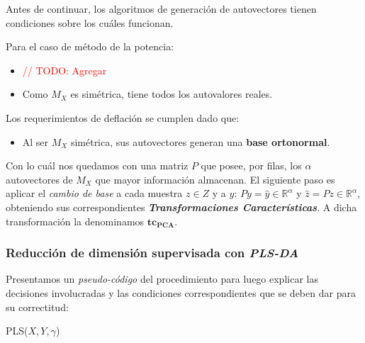 Antes de continuar, los algoritmos de generaci\'on de autovectores tienen condiciones sobre los cu\'ales funcionan.

Para el caso de m\'etodo de la potencia:

\begin{itemize}
\item \textcolor{red}{// TODO: Agregar}
\item Como $M_{X}$ es sim\'etrica, tiene todos los autovalores reales.
\end{itemize}

Los requerimientos de deflaci\'on se cumplen dado que:

\begin{itemize}
\item Al ser $M_{X}$ sim\'etrica, sus autovectores generan una \textbf{base ortonormal}.
\end{itemize}

Con lo cu\'al nos quedamos con una matriz $P$ que posee, por filas, los $\alpha$ autovectores de $M_{X}$ que mayor informaci\'on almacenan. El siguiente paso es aplicar el \textit{cambio de base} a cada muestra $z \in Z$ y a $y$: $Py = \hat{y} \in \mathbb{R}^{\alpha}$ y $\hat{z} = Pz \in \mathbb{R}^{\alpha}$, obteniendo sus correspondientes \textit{\textbf{Transformaciones Caracter\'isticas}}. A dicha transformaci\'on la denominamos $\mathbf{tc_{PCA}}$.

\subsubsection{Reducci\'on de dimensi\'on supervisada con \textit{PLS-DA}} \label{desarrollo_PLSDA}

Presentamos un \textit{pseudo-c\'odigo} del procedimiento para luego explicar las decisiones involucradas y las condiciones correspondientes que se deben dar para su correctitud: \\

\begin{algorithm}
\begin{algorithmic}[1]
 
\ENDFOR
{}
\end{algorithmic}
\caption{PLS($X, Y, \gamma$)}
\end{algorithm}

